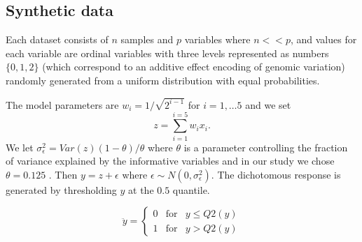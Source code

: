 \documentclass[a4paper]{amsart}
\begin{document}
\subsection{Synthetic data} 
\label{section:synthetic_data}
 Each dataset consists of $n$ samples and $p$ variables where $n << p$,
and values for each variable are ordinal variables with three levels represented as numbers $\{0, 1, 2\}$ (which
correspond to an additive effect encoding of genomic variation) randomly generated from a uniform distribution with equal
probabilities.  

The model parameters are $w_i = 1/\sqrt{2^{i-1}}$ for $i =1,\ldots 5$ and we set 
\begin{equation}
\label{equation:synthetic.data}
z =  \sum_{i=1}^{i=5} {w_i x_i}.
\end{equation}
We let $\sigma_\epsilon^2 = Var(z)(1-\theta)/\theta $  where $\theta$ is a parameter controlling the fraction of variance explained by the informative variables and in our study we chose $\theta = 0.125$ . Then 
$y =   z + \epsilon$ where $\epsilon \sim  N(0, \sigma_\epsilon^2).$
The dichotomous response is generated by thresholding $y$ at the $0.5$ quantile.

$$
\ddot{y} =    \left\{ \begin{array}{rcl}
			  0 & \mbox{for} & y \leq Q2(y) \\
			  1 & \mbox{for} & y > Q2(y)
		 \end{array}\right.
$$
\end{document}
